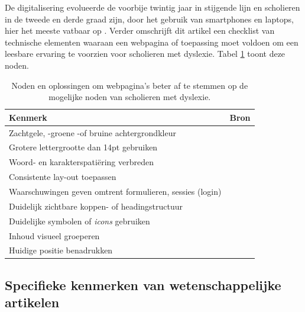 De digitalisering evolueerde de voorbije twintig jaar in stijgende lijn en scholieren in de tweede en derde graad zijn, door het gebruik van smartphones en laptops, hier het meeste vatbaar op \autocite{Fernando2021}. Verder omschrijft dit artikel een checklist van technische elementen waaraan een webpagina of toepassing moet voldoen om een leesbare ervaring te voorzien voor scholieren met dyslexie. Tabel \ref{table:dyslexia-necessaries} toont deze noden.

\begin{center}
		\begin{table}[H]
	\begin{tabular}{ | m{9cm} | m{6cm} | } 
		\hline
		\textbf{Kenmerk} & \textbf{Bron} \\
		\hline
		Zachtgele, -groene -of bruine achtergrondkleur 	& \textcite{Santana2012, Rello2017} 	\\ \hline
		Grotere lettergrootte dan 14pt gebruiken		& \autocite{Rello2015} 					\\ \hline
		Woord- en karakterspatiëring verbreden 			& \textcite{Santana2012, Rello2013b} 	\\ \hline
		Consistente lay-out toepassen					& \autocite{Rello2015, Fernando2021} 	\\  \hline
		Waarschuwingen geven omtrent formulieren, sessies (login) & \autocite{Fernando2021}  	\\ \hline
		Duidelijk zichtbare koppen- of headingstructuur & \autocite{Rello2012a} 				\\ \hline
		Duidelijke symbolen of \textit{icons} gebruiken & \autocite{Rello2012} 					\\ \hline
		Inhoud visueel groeperen 						& \autocite{Rello2015, Fernando2021}	\\ \hline
		Huidige positie benadrukken 					& \autocite{Fernando2021} 				\\ \hline
		
	\end{tabular}
	\caption{Noden en oplossingen om webpagina's beter af te stemmen op de mogelijke noden van scholieren met dyslexie.}
	\label{table:dyslexia-necessaries}
	\end{table}
\end{center}

\subsection{Specifieke kenmerken van wetenschappelijke artikelen}

